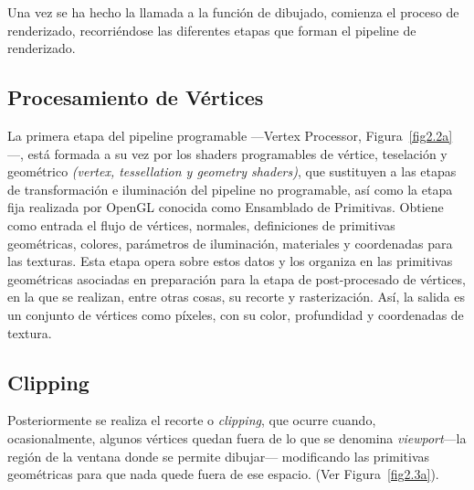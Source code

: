 Una vez se ha hecho la llamada a la función de dibujado, comienza el proceso de
renderizado, recorriéndose las diferentes etapas que forman el pipeline de
renderizado. 

\subsection{Procesamiento de Vértices}
\label{ref:procesamiento}

La primera etapa del pipeline programable ---Vertex Processor,
Figura~\ref{fig2.2a}---, está formada a su vez por los shaders programables de
vértice, teselación y geométrico \textit{(vertex, tessellation y geometry
shaders)}, que sustituyen a las etapas de transformación e iluminación del
pipeline no programable, así como la etapa fija realizada por OpenGL conocida
como Ensamblado de Primitivas. Obtiene como entrada el flujo de vértices,
normales, definiciones de primitivas geométricas, colores, parámetros de
iluminación, materiales y coordenadas para las texturas. Esta etapa opera sobre
estos datos y los organiza en las primitivas geométricas asociadas en
preparación para la etapa de post-procesado de vértices, en la que se realizan,
entre otras cosas, su recorte y rasterización.  Así, la salida es un conjunto de
vértices como píxeles, con su color, profundidad y coordenadas de textura.

\subsection{Clipping}
\label{ref:clipping}

Posteriormente se realiza el recorte o \textit{clipping}, que ocurre cuando,
ocasionalmente, algunos vértices quedan fuera de lo que se denomina
\textit{viewport}---la región de la ventana donde se permite dibujar---
modificando las primitivas geométricas para que nada quede fuera de ese espacio.
(Ver Figura~\ref{fig2.3a}).

